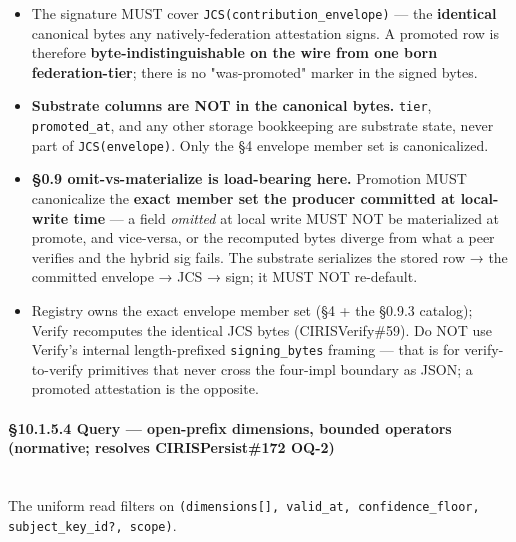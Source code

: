 \documentclass[11pt]{article}
\begin{document}
\begin{itemize}\setlength\itemsep{0pt}
\item The signature MUST cover \texttt{JCS(contribution\_envelope)} — the \textbf{identical} canonical bytes any natively-federation attestation signs. A promoted row is therefore \textbf{byte-indistinguishable on the wire from one born federation-tier}; there is no "was-promoted" marker in the signed bytes.
\item \textbf{Substrate columns are NOT in the canonical bytes.} \texttt{tier}, \texttt{promoted\_at}, and any other storage bookkeeping are substrate state, never part of \texttt{JCS(envelope)}. Only the §4 envelope member set is canonicalized.
\item \textbf{§0.9 omit-vs-materialize is load-bearing here.} Promotion MUST canonicalize the \textbf{exact member set the producer committed at local-write time} — a field \textit{omitted} at local write MUST NOT be materialized at promote, and vice-versa, or the recomputed bytes diverge from what a peer verifies and the hybrid sig fails. The substrate serializes the stored row → the committed envelope → JCS → sign; it MUST NOT re-default.
\item Registry owns the exact envelope member set (§4 + the §0.9.3 catalog); Verify recomputes the identical JCS bytes (CIRISVerify\#59). Do NOT use Verify's internal length-prefixed \texttt{signing\_bytes} framing — that is for verify-to-verify primitives that never cross the four-impl boundary as JSON; a promoted attestation is the opposite.
\end{itemize}


\paragraph{§10.1.5.4 Query — open-prefix dimensions, bounded operators (normative; resolves CIRISPersist\#172 OQ-2)}\mbox{}\\


The uniform read filters on \texttt{(dimensions[], valid\_at, confidence\_floor, subject\_key\_id?, scope)}.
\end{document}

